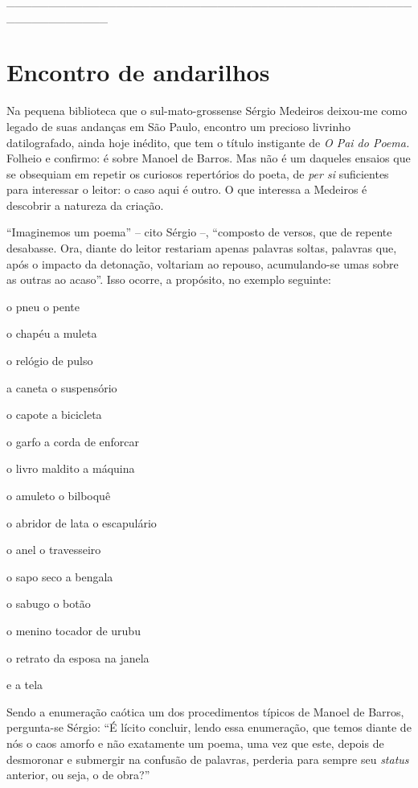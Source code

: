 \_\_\_\_\_\_\_\_\_\_\_\_\_\_\_\_\_\_\_\_\_\_\_\_\_\_\_\_\_\_\_\_\_\_\_\_\_\_\_\_\_\_\_\_\_\_\_\_\_\_\_\_\_\_\_\_\_\_\_\_

\chapter{Encontro de andarilhos}

Na pequena biblioteca que o sul-mato-grossense Sérgio Medeiros deixou-me
como legado de suas andanças em São Paulo, encontro um precioso livrinho
datilografado, ainda hoje inédito, que tem o título instigante de
\emph{O Pai do Poema.} Folheio e confirmo: é sobre Manoel de Barros. Mas
não é um daqueles ensaios que se obsequiam em repetir os curiosos
repertórios do poeta, de \emph{per si} suficientes para interessar o
leitor: o caso aqui é outro. O que interessa a Medeiros é descobrir a
natureza da criação.

``Imaginemos um poema'' -- cito Sérgio --, ``composto de versos, que de
repente desabasse. Ora, diante do leitor restariam apenas palavras
soltas, palavras que, após o impacto da detonação, voltariam ao repouso,
acumulando-se umas sobre as outras ao acaso''. Isso ocorre, a propósito,
no exemplo seguinte:

o pneu o pente

o chapéu a muleta

o relógio de pulso

a caneta o suspensório

o capote a bicicleta

o garfo a corda de enforcar

o livro maldito a máquina

o amuleto o bilboquê

o abridor de lata o escapulário

o anel o travesseiro

o sapo seco a bengala

o sabugo o botão

o menino tocador de urubu

o retrato da esposa na janela

e a tela

Sendo a enumeração caótica um dos procedimentos típicos de Manoel de
Barros, pergunta-se Sérgio: ``É lícito concluir, lendo essa enumeração,
que temos diante de nós o caos amorfo e não exatamente um poema, uma vez
que este, depois de desmoronar e submergir na confusão de palavras,
perderia para sempre seu \emph{status} { } anterior, ou seja, o de
obra?''

